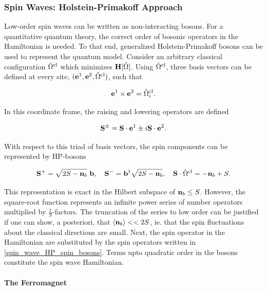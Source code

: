 \documentclass{homework}
\begin{document}
\subsubsection{Spin Waves: Holstein-Primakoff Approach}

Low-order spin waves can be written as non-interacting bosons. For a quantitative quantum theory, the correct order of bosonic operators in the Hamiltonian is needed. To that end, generalized Holstein-Primakoff bosons can be used to represent the quantum model. Consider an arbitrary classical configuration $\hat{\Omega}^{\textnormal{cl}}$ which minimizes ${\bf H}[\hat{\Omega}]$. Using $\hat{\Omega}^{\textnormal{cl}}$, three basis vectors can be defined at every site, $({\bf e}^1, {\bf e}^2, \hat{\Omega}^{\textnormal{cl}})$, such that 

$$
    {\bf e}^1 \times {\bf e}^2 = \hat{\Omega}^{\textnormal{cl}}_i.
$$

In this coordinate frame, the raising and lowering operators are defined 

\begin{equation}
    {\bf S}^{\pm} = {\bf S} \cdot {\bf e}^1 \pm i {\bf S} \cdot {\bf e}^2.
\end{equation}

With respect to this triad of basis vectors, the spin components can be represented by HP-bosons 

\begin{equation}
    {\bf S}^+ = \sqrt{2S - {\bf n}_b} \textnormal{ }  {\bf b}, \quad {\bf S}^- = {\bf b}^\dagger \sqrt{2S - {\bf n}_b}, \quad {\bf S} \cdot \hat{\Omega}^{\textnormal{cl}} = -{\bf n}_b + S.
    \label{spin_wave_HP_spin_bosons}
\end{equation}

This representation is exact in the Hilbert subspace of ${\bf n}_b \leq S$. However, the square-root function represents an infinite power series of number operators multiplied by $\frac{1}{S}$-factors. The truncation of the series to low order can be justified if one can show, a posteriori, that $\langle {\bf n}_b \rangle << 2S$, ie. that the spin fluctuations about the classical directions are small. 
Next, the spin operator in the Hamiltonian are substituted by the spin operators written in \cref{spin_wave_HP_spin_bosons}. Terms upto quadratic order in the bosons constitute the spin wave Hamiltonian. \\

\paragraph{The Ferromagnet}
\end{document}
